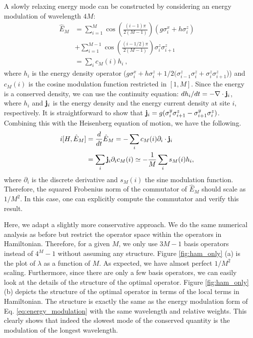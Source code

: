 \documentclass[twocolumn,superscriptaddress, prb]{revtex4-1}
\begin{document}
A slowly relaxing energy mode can be constructed by considering an energy modulation of wavelength $4M$:
\begin{align}
\hat{E}_M &= \sum_{i=1}^{M} \cos\left(\frac{(i-1)\pi}{2(M-1)}\right)(g \sigma^x_i + h\sigma^z_i)\nonumber\\
&+ \sum_{i=1}^{M-1} \cos\left(\frac{(i-1/2)\pi}{2(M-1)}\right)\sigma^z_i\sigma^z_{i+1}\\
&= \sum_i c_M(i) h_i ~, 
\label{eq:energy_modulation}
\end{align}
where $h_i$ is the energy density operator ($g \sigma^x_i + h\sigma^z_i + 1/2(\sigma^z_{i-1}\sigma^z_i + \sigma^z_i\sigma^z_{i+1}$))
and $c_M(i)$ is the cosine modulation function restricted in $[1,M]$. 
Since the energy is a conserved density, we can use the continuity equation: 
$d h_i/dt = -\nabla \cdot {\bf j}_i$, where $h_i$ and ${\bf j}_i$ is the energy density and the energy current density at site $i$, respectively.
It is straightforward to show that ${\bf j}_i = g(\sigma^y_i \sigma^z_{i+1} - \sigma^y_{i+1} \sigma^z_i)$. 
Combining this with the Heisenberg equation of motion, we have the following.  
\begin{align}
 i[H,\hat{E}_M] &= \frac{d}{dt} \hat{E}_M = -\sum_i c_M(i) \partial_i \cdot {\bf j}_i \\
 &= \sum_i {\bf j}_i \partial_i c_M(i) \simeq -\frac{1}{M} \sum_i s_M(i) h_i,  
\end{align}
where $\partial_i$ is the discrete derivative and $s_M(i)$ the sine modulation function.  
Therefore, the squared Frobenius norm of the commutator of $\hat{E}_M$ should scale as $1/M^2$.  In this case, one can explicitly compute the commutator and verify this result.

Here, we adapt a slightly more conservative approach.
We do the same numerical analysis as before but restrict the operator space within the operators in Hamiltonian.
Therefore, for a given $M$, we only use $3M - 1$ basis operators instead of $4^M-1$ without assuming any structure.
Figure \ref{fig:ham_only} (a) is the plot of $\lambda$ as a function of $M$.
As expected, we have almost perfect $1/M^2$ scaling.
Furthermore, since there are only a few basis operators, we can easily look at the details of the structure of the optimal operator.
Figure \ref{fig:ham_only} (b) depicts the structure of the optimal operator in terms of the local terms in Hamiltonian.
The structure is exactly the same as the energy modulation form of Eq. \eqref{eq:energy_modulation} with the same wavelength and relative weights.
This clearly shows that indeed the slowest mode of the conserved quantity is the modulation of the longest wavelength.
\end{document}

